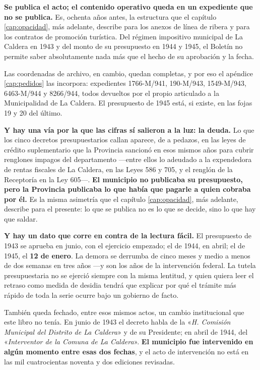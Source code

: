\textbf{Se publica el acto; el contenido operativo queda en un expediente que no se publica.}
Es, ochenta años antes, la estructura que el capítulo \ref{cap:opacidad}, más adelante, describe para los
anexos de línea de ribera y para los contratos de promoción turística. Del régimen impositivo
municipal de La Caldera en 1943 y del monto de su presupuesto en 1944 y 1945, el Boletín no
permite saber absolutamente nada más que el hecho de su aprobación y la fecha.

\begin{cautela}
Las coordenadas de archivo, en cambio, quedan completas, y por eso el apéndice
\ref{cap:pedidos} las incorpora: expedientes 1766-M/941, 190-M/943, 1549-M/943, 6463-M/944 y
8266/944, todos devueltos por el propio articulado a la Municipalidad de La Caldera. El
presupuesto de 1945 está, si existe, en las fojas 19 y 20 del último.
\end{cautela}

\textbf{Y hay una vía por la que las cifras sí salieron a la luz: la deuda.} Lo que los cinco
decretos presupuestarios callan aparece, de a pedazos, en las leyes de crédito suplementario
que la Provincia sancionó en esos mismos años para cubrir renglones impagos del departamento
---entre ellos lo adeudado a la expendedora de rentas fiscales de La Caldera, en las Leyes 586
y 705, y el renglón de la Receptoría en la Ley 605---. \textbf{El municipio no publicaba su
presupuesto, pero la Provincia publicaba lo que había que pagarle a quien cobraba por él.} Es
la misma asimetría que el capítulo \ref{cap:opacidad}, más adelante, describe para el presente: lo que se
publica no es lo que se decide, sino lo que hay que saldar.

\textbf{Y hay un dato que corre en contra de la lectura fácil.} El presupuesto de 1943 se
aprueba en junio, con el ejercicio empezado; el de 1944, en abril; el de 1945, el \textbf{12 de
enero}. La demora se derrumba de cinco meses y medio a menos de dos semanas en tres años ---y
son los años de la intervención federal. La tutela presupuestaria no se ejerció siempre con la
misma lentitud, y quien quiera leer el retraso como medida de desidia tendrá que explicar por
qué el trámite más rápido de toda la serie ocurre bajo un gobierno de facto.

También queda fechado, entre esos mismos actos, un cambio institucional que este libro no
tenía. En junio de 1943 el decreto habla de la «\textit{H. Comisión Municipal del Distrito de
La Caldera}» y de su Presidente; en abril de 1944, del «\textit{Interventor de la Comuna de La
Caldera}». \textbf{El municipio fue intervenido en algún momento entre esas dos fechas}, y el
acto de intervención no está en las mil cuatrocientas noventa y dos ediciones revisadas.

